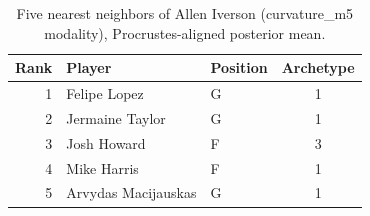 \begin{table}[htbp]
  \centering\small
  \begin{tabular}{rllc}
    \toprule
    Rank & Player & Position & Archetype \\
    \midrule
    1 & Felipe Lopez & G & 1 \\
    2 & Jermaine Taylor & G & 1 \\
    3 & Josh Howard & F & 3 \\
    4 & Mike Harris & F & 1 \\
    5 & Arvydas Macijauskas & G & 1 \\
    \bottomrule
  \end{tabular}
  \caption{Five nearest neighbors of Allen Iverson (curvature_m5 modality), Procrustes-aligned posterior mean.}
  \label{tab:Allen_Iverson_neighbors_curvature_m5}
\end{table}


